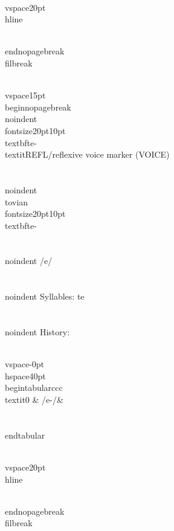 \\vspace{20pt}\\hline

\\end{nopagebreak}
\\filbreak



\\vspace{15pt}
\\begin{nopagebreak}
\\noindent{\\fontsize{20pt}{10pt}\\textbf{te-} } \\textit{REFL/reflexive voice marker} (VOICE)\\\\
\\noindent {\\tovian \\fontsize{20pt}{10pt} \\textbf{te-} }\\\\
\\noindent /{}{\textprimstress}e/\\\\
\\noindent Syllables: te\\\\


\\noindent History:

\\vspace{-0pt}
\\hspace{40pt}
\\begin{tabular}{ccc}
\\textit{0} & /{}e-/& \\\\
\\end{tabular}

\\vspace{20pt}\\hline

\\end{nopagebreak}
\\filbreak



